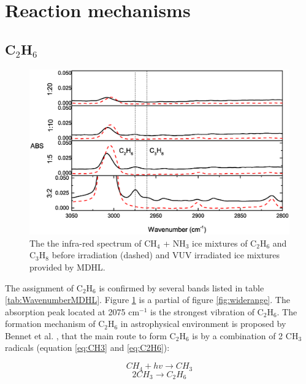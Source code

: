 \section{Reaction mechanisms} %

\subsection{C$_2$H$_6$}

\begin{figure}
\centering
\includegraphics[width=\textwidth]{figures/chapter3/C2H6.eps}
\caption{The the infra-red spectrum of CH$_4$ + NH$_3$ ice mixtures of C$_2$H$_6$ and C$_3$H$_8$ before irradiation (dashed) and VUV irradiated ice mixtures provided by MDHL. }
\label{fig:C2H6}
\end{figure}

The assignment of C$_2$H$_6$ is confirmed by several bands listed in table \ref{tab:WavenumberMDHL}. Figure \ref{fig:C2H6} is a partial of figure \ref{fig:widerange}. The absorption peak located at 2075 cm$^{-1}$ is the strongest vibration of C$_2$H$_6$. The formation mechanism of C$_2$H$_6$ in astrophysical environment is proposed by Bennet et al. \cite{bennett2006laboratory}, that the main route to form C$_2$H$_6$ is by a combination of 2 CH$_3$ radicals (equation \ref{eq:CH3} and \ref{eq:C2H6}):

\begin{equation}
CH_4 + hv \rightarrow CH_3
\label{eq:CH3}
\end{equation}
\begin{equation}
2 CH_3 \rightarrow C_2H_6
\label{eq:C2H6}
\end{equation}

